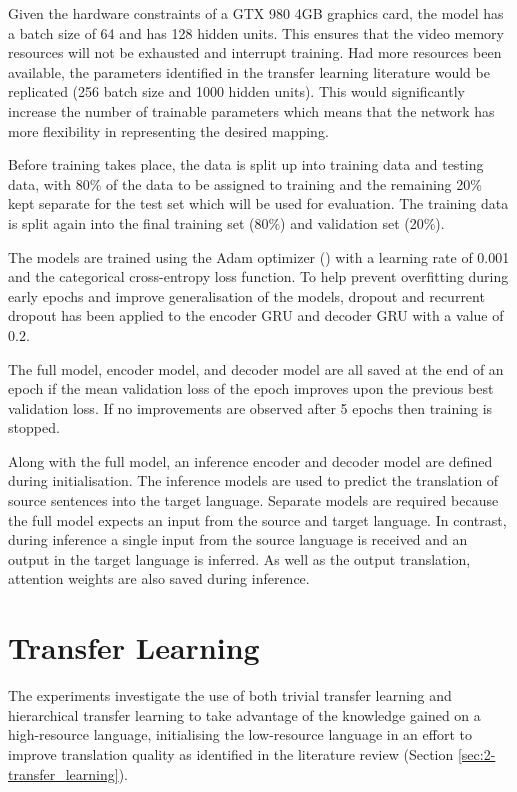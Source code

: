 Given the hardware constraints of a GTX 980 4GB graphics card, the model has a batch size of 64 and has 128 hidden units. This ensures that the video memory resources will not be exhausted and interrupt training. Had more resources been available, the parameters identified in the transfer learning literature would be replicated (256 batch size and 1000 hidden units). This would significantly increase the number of trainable parameters which means that the network has more flexibility in representing the desired mapping.

Before training takes place, the data is split up into training data and testing data, with 80\% of the data to be assigned to training and the remaining 20\% kept separate for the test set which will be used for evaluation. The training data is split again into the final training set (80\%) and validation set (20\%).

The models are trained using the Adam optimizer (\cite{adam_optimizer_2014}) with a learning rate of 0.001 and the categorical cross-entropy loss function. To help prevent overfitting during early epochs and improve generalisation of the models, dropout and recurrent dropout has been applied to the encoder \acrshort{GRU} and decoder \acrshort{GRU} with a value of $0.2$. 

The full model, encoder model, and decoder model are all saved at the end of an epoch if the mean validation loss of the epoch improves upon the previous best validation loss. If no improvements are observed after 5 epochs then training is stopped.


Along with the full model, an inference encoder and decoder model are defined during initialisation. The inference models are used to predict the translation of source sentences into the target language. Separate models are required because the full model expects an input from the source and target language. In contrast, during inference a single input from the source language is received and an output in the target language is inferred. As well as the output translation, attention weights are also saved during inference.

\section{Transfer Learning}
\label{sec:3-transfer_learning}

The experiments investigate the use of both trivial transfer learning and hierarchical transfer learning to take advantage of the knowledge gained on a high-resource language, initialising the low-resource language in an effort to improve translation quality as identified in the literature review (Section \ref{sec:2-transfer_learning}).

